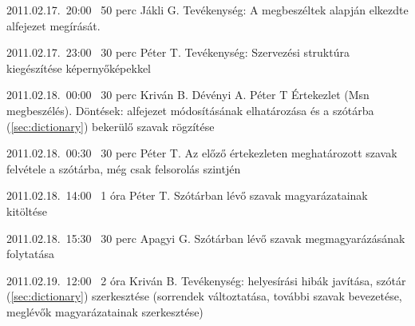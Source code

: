 \begin{naplo}
\bejegyzes
{2011.02.17.~20:00~}
{50 perc}
{Jákli G.}
{Tevékenység: A megbeszéltek alapján el\-kezdte  alfejezet megírását.}

\bejegyzes
{2011.02.17.~23:00~}
{30 perc}
{Péter T.}
{Tevékenység: Szervezési struktúra kiegészí\-tése képernyőképekkel}

\bejegyzes
{2011.02.18.~00:00~}
{30 perc}
{Kriván B.\newline
Dévényi A.\newline
Péter T}
{Értekezlet (Msn megbeszélés).\newline
Döntések:  alfejezet módosításának elhatározása és a szótárba (\ref{sec:dictionary}) bekerülő szavak rögzítése}

\bejegyzes
{2011.02.18.~00:30~}
{30 perc}
{Péter T.}
{Az előző értekezleten meghatározott szavak felvétele a szótárba, még csak felsorolás szint\-jén}

\bejegyzes
{2011.02.18.~14:00~}
{1 óra}
{Péter T.}
{Szótárban lévő szavak magyarázatainak kitöl\-tése}

\bejegyzes
{2011.02.18.~15:30~}
{30 perc}
{Apagyi G.}
{Szótárban lévő szavak megmagyarázásának folytatása}

\bejegyzes
{2011.02.19.~12:00~}
{2 óra}
{Kriván B.}
{Tevékenység: helyesírási hibák javítása, szó\-tár (\ref{sec:dictionary}) szerkesztése (sorrendek változtatása, további szavak bevezetése, meglévők magya\-rázatainak szerkesztése)}

\end{naplo}

